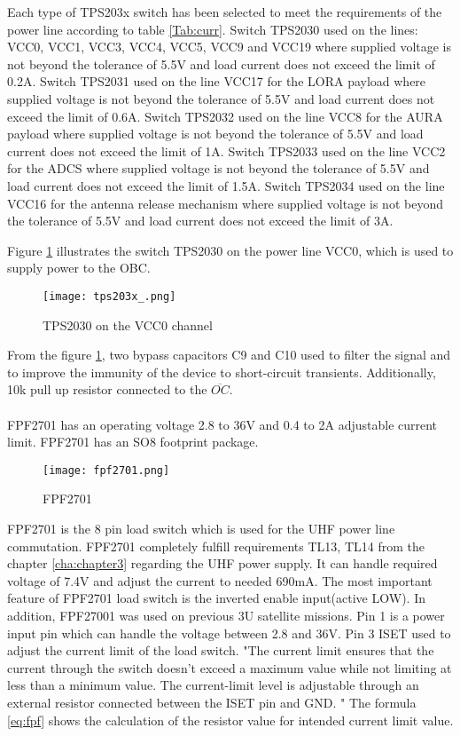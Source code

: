 Each type of TPS203x switch has been selected to meet the requirements of the power line according to table \ref{Tab:curr}. Switch TPS2030 used on the lines: VCC0, VCC1, VCC3, VCC4, VCC5, VCC9 and VCC19  where supplied voltage is not beyond the tolerance of 5.5V and load current does not exceed the limit of 0.2A. Switch TPS2031 used on the line VCC17 for the LORA payload where supplied voltage is not beyond the tolerance of 5.5V and load current does not exceed the limit of 0.6A. Switch TPS2032 used on the line VCC8 for the AURA payload where supplied voltage is not beyond the tolerance of 5.5V and load current does not exceed the limit of 1A. Switch TPS2033  used on the line VCC2 for the ADCS where supplied voltage is not beyond the tolerance of 5.5V and load current does not exceed the limit of 1.5A. Switch TPS2034  used on the line VCC16 for the antenna release mechanism where supplied voltage is not beyond the tolerance of 5.5V and load current does not exceed the limit of 3A. 

Figure \ref{fig: vcc0} illustrates the switch TPS2030 on the power line VCC0, which is used to supply power to the OBC.

\begin{figure}[h]
	\centering
	\texttt{[image: tps203x\_.png]}
	\caption{TPS2030 on the VCC0 channel}
	\label{fig: vcc0}
\end{figure} 

From the figure \ref{fig: vcc0}, two bypass capacitors C9 and C10 used to filter the signal and to improve the immunity of the device to short-circuit transients.   Additionally, 10k pull up resistor connected to the $\overline{OC}$. \\ \\

FPF2701 has an operating voltage 2.8 to 36V and 0.4 to 2A adjustable current limit. FPF2701 has an SO8 footprint package.\\

\begin{figure}[h]
	\centering
	\texttt{[image: fpf2701.png]}
	\caption{FPF2701 \cite{27}}
	\label{fig: fpf27}
\end{figure} 

FPF2701 is the 8 pin load switch which is used for the UHF power line commutation. FPF2701 completely fulfill requirements TL13, TL14 from the chapter \ref{cha:chapter3} regarding the UHF power supply. It can handle required voltage of 7.4V and adjust the current to needed 690mA. The most important feature of FPF2701 load switch is the inverted enable input(active LOW). In addition, FPF27001 was used on previous 3U satellite missions. Pin 1 is a power input pin which can handle the voltage between 2.8 and 36V. Pin 3 ISET used to adjust the current limit of the load switch. \cite{27} "The  current  limit  ensures  that  the  current  through  the switch  doesn't  exceed  a  maximum  value  while  not limiting  at  less  than  a  minimum  value.  The current-limit level    is    adjustable    through    an    external    resistor connected between the ISET pin and GND. " The formula \ref{eq:fpf} shows the calculation of the resistor value for intended current limit value.

